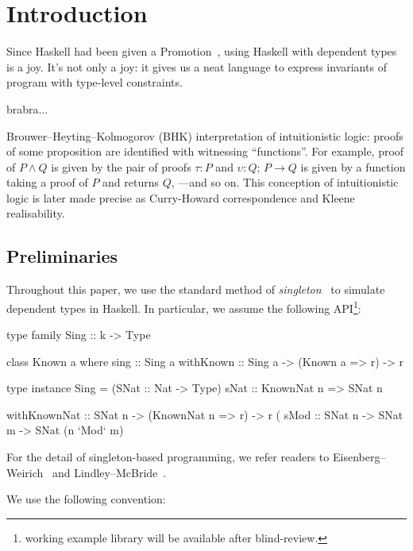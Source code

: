 \documentclass[demotion-paper.tex]{subfiles}
\begin{document}
\section{Introduction}
Since Haskell had been given a Promotion~\cite{Yorgey:2012}, using Haskell with dependent types is a joy.
It's not only a joy: it gives us a neat language to express invariants of program with type-level constraints.

brabra...

Brouwer--Heyting--Kolmogorov (BHK) interpretation of intuitionistic logic: proofs of some proposition are identified with witnessing ``functions''.
For example, proof of $P \land Q$ is given by the pair of proofs $\tau: P$ and $\upsilon: Q$; $P \to Q$ is given by a function taking a proof of $P$ and returns $Q$, ---and so on.
This conception of intuitionistic logic is later made precise as Curry-Howard correspondence and Kleene realisability.

\subsection{Preliminaries}
Throughout this paper, we use the standard method of \emph{singleton}~\cite{Eisenberg:2012} to simulate dependent types in Haskell.
In particular, we assume the following API\footnote{working example library will be available after blind-review.}:

\begin{code}
type family Sing :: k -> Type

class Known a where
  sing :: Sing a
withKnown :: Sing a -> (Known a => r) -> r

type instance Sing = (SNat :: Nat -> Type)
sNat :: KnownNat n => SNat n

withKnownNat :: SNat n -> (KnownNat n => r) -> r
(%
sMod :: SNat n -> SNat m -> SNat (n `Mod` m)
\end{code}

For the detail of singleton-based programming, we refer readers to Eisenberg--Weirich~\cite{Eisenberg:2012} and Lindley--McBride~\cite{10.1145/2503778.2503786}.

We use the following convention:
\end{document}
